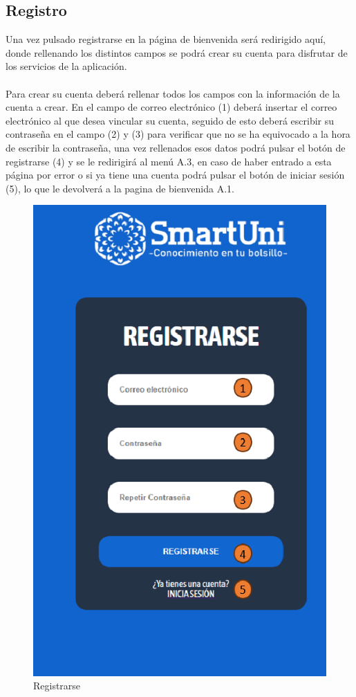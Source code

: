 \documentclass[12pt]{report}
\begin{document}
\begin{appendices}
\section{Registro}
Una vez pulsado registrarse en la página de bienvenida será redirigido aquí, donde rellenando los distintos campos se podrá crear su cuenta para disfrutar de los servicios de la aplicación.
\\\\Para crear su cuenta deberá rellenar todos los campos con la información de la cuenta a crear. En el campo de correo electrónico (1) deberá insertar el correo electrónico al que desea vincular su cuenta, seguido de esto deberá escribir su contraseña en el campo (2) y (3) para verificar que no se ha equivocado a la hora de escribir la contraseña, una vez rellenados esos datos podrá pulsar el botón de registrarse (4) y se le redirigirá al menú A.3, en caso de haber entrado a esta página por error o si ya tiene una cuenta podrá pulsar el botón de iniciar sesión (5), lo que le devolverá a la pagina de bienvenida A.1.\\
\begin{figure}[H]
    \centering
    \includegraphics[scale = 0.7]{imagenes//manual_de_usuario/3.png}
    \caption{Registrarse}
    \label{fig:Figura3.4.3}
\end{figure}
\newpage

\end{appendices}
\end{document}
